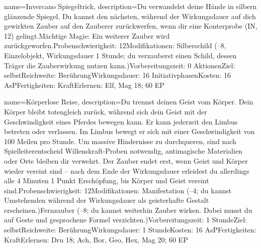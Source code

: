{
    name={Invercano Spiegeltrick},
    description={Du verwandelst deine Hände in silbern glänzende Spiegel. Du kannst den nächsten, während der Wirkungsdauer auf dich gewirkten Zauber auf den Zauberer zurückwerfen, wenn dir eine Konterprobe (IN, 12) gelingt.\newline Mächtige Magie: Ein weiterer Zauber wird zurückgeworfen.\newline Probenschwierigkeit: 12\newline Modifikationen: Silberschild (–8, Einzelobjekt, Wirkungsdauer 1 Stunde; du verzauberst einen Schild, dessen Träger die Zauberwirkung nutzen kann.)\newline Vorbereitungszeit: 0 Aktionen\newline Ziel: selbst\newline Reichweite: Berührung\newline Wirkungsdauer: 16 Initiativphasen\newline Kosten: 16 AsP\newline Fertigkeiten: Kraft\newline Erlernen: Elf, Mag 18; 60 EP}
}


{
    name={Körperlose Reise},
    description={Du trennst deinen Geist vom Körper. Dein Körper bleibt totengleich zurück, während sich dein Geist mit der Geschwindigkeit eines Pferdes bewegen kann. Er kann jederzeit den Limbus betreten oder verlassen. Im Limbus bewegt er sich mit einer Geschwindigkeit von 100 Meilen pro Stunde. Um massive Hindernisse zu durchqueren, sind nach Spielleiterentscheid Willenskraft-Proben notwendig, antimagische Materialien oder Orte bleiben dir verwehrt. Der Zauber endet erst, wenn Geist und Körper wieder vereint sind – nach dem Ende der Wirkungsdauer erleidest du allerdings alle 4 Minuten 1 Punkt Erschöpfung, bis Körper und Geist vereint sind.\newline Probenschwierigkeit: 12\newline Modifikationen: Manifestation (–4; du kannst Umstehenden während der Wirkungsdauer als geisterhafte Gestalt erscheinen.)\newline Fernzauber (–8; du kannst weiterhin Zauber wirken. Dabei musst du auf Geste und gesprochene Formel verzichten.)\newline Vorbereitungszeit: 1 Stunde\newline Ziel: selbst\newline Reichweite: Berührung\newline Wirkungsdauer: 1 Stunde\newline Kosten: 16 AsP\newline Fertigkeiten: Kraft\newline Erlernen: Dru 18; Ach, Bor, Geo, Hex, Mag 20; 60 EP}
}


